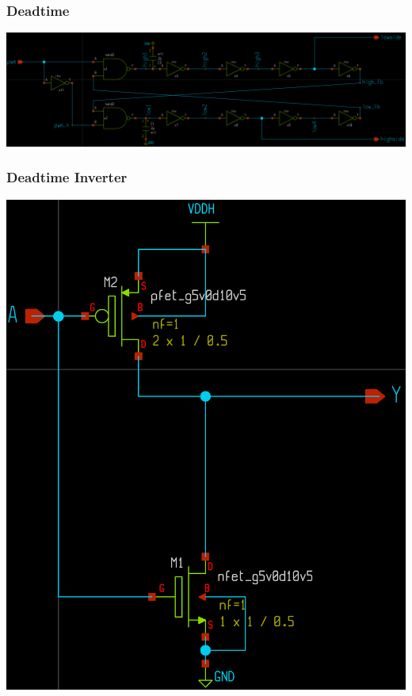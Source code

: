 \documentclass{beamer}
\begin{document}
\begin{frame}
  \frametitle{Deadtime}
  \includegraphics[scale=0.085]{deadtime.png}
\end{frame}

\begin{frame}
  \frametitle{Deadtime Inverter}
  \includegraphics[scale=0.09]{inverter.png}
\end{frame}
\end{document}
